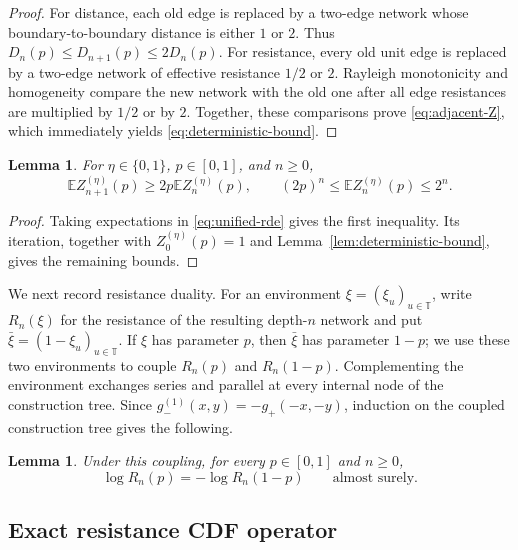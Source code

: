 \documentclass[12pt]{amsart}
\numberwithin{equation}{section}
\theoremstyle{plain}
\newtheorem{lemma}[theorem]{Lemma}
\theoremstyle{definition}
\newcommand{\E}{\mathbb E}
\begin{document}
\begin{proof}
For distance, each old edge is replaced by a two-edge network whose
boundary-to-boundary distance is either $1$ or $2$.  Thus
$D_n(p)\le D_{n+1}(p)\le2D_n(p)$.  For resistance, every old unit edge is
replaced by a two-edge network of effective resistance $1/2$ or $2$.
Rayleigh monotonicity and homogeneity compare the new network with the old one
after all edge resistances are multiplied by $1/2$ or by $2$.  Together,
these comparisons prove \eqref{eq:adjacent-Z}, which immediately yields
\eqref{eq:deterministic-bound}.
\end{proof}

\begin{lemma}
\label{lem:first-moment-bounds}
For $\eta\in\{0,1\}$, $p\in[0,1]$, and $n\ge0$,
\begin{equation}
 \E Z_{n+1}^{(\eta)}(p)\ge2p\E Z_n^{(\eta)}(p),
 \qquad
 (2p)^n\le\E Z_n^{(\eta)}(p)\le2^n.
 \label{eq:first-moment-recursion}
\end{equation}
\end{lemma}

\begin{proof}
Taking expectations in \eqref{eq:unified-rde} gives the first inequality.
Its iteration, together with $Z_0^{(\eta)}(p)=1$ and
Lemma~\ref{lem:deterministic-bound}, gives the remaining bounds.
\end{proof}

We next record resistance duality.  For an
environment $\xi=(\xi_u)_{u\in\mathbb T}$, write $R_n(\xi)$ for the
resistance of the resulting depth-$n$ network and put
$\bar\xi=(1-\xi_u)_{u\in\mathbb T}$.  If $\xi$ has parameter $p$, then
$\bar\xi$ has parameter $1-p$; we use these two environments to couple
$R_n(p)$ and $R_n(1-p)$.  Complementing the environment exchanges series
and parallel at every internal node of the construction tree.  Since
$g_-^{(1)}(x,y)=-g_+(-x,-y)$, induction on the coupled construction
tree gives the following.

\begin{lemma}
\label{lem:resistance-duality}
Under this coupling, for every $p\in[0,1]$ and $n\ge0$,
\begin{equation}
 \log R_n(p)=-\log R_n(1-p)
 \qquad\text{almost surely}.
 \label{eq:resistance-duality}
\end{equation}
\end{lemma}

\subsection{Exact resistance CDF operator}
\label{sec:cdf-operator}
\end{document}
